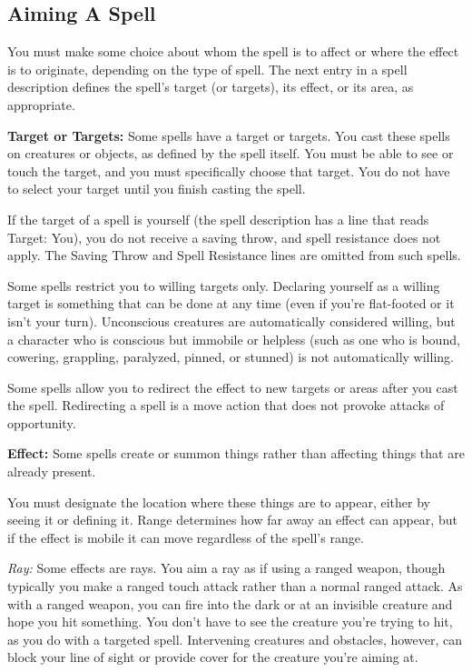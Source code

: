 \subsection{Aiming A Spell}
You must make some choice about whom the spell is to affect or where the effect is to originate, depending on the type of spell. The next entry in a spell description defines the spell's target (or targets), its effect, or its area, as appropriate.

\textbf{Target or Targets:} Some spells have a target or targets. You cast these spells on creatures or objects, as defined by the spell itself. You must be able to see or touch the target, and you must specifically choose that target. You do not have to select your target until you finish casting the spell.

If the target of a spell is yourself (the spell description has a line that reads Target: You), you do not receive a saving throw, and spell resistance does not apply. The Saving Throw and Spell Resistance lines are omitted from such spells.

Some spells restrict you to willing targets only. Declaring yourself as a willing target is something that can be done at any time (even if you're flat-footed or it isn't your turn). Unconscious creatures are automatically considered willing, but a character who is conscious but immobile or helpless (such as one who is bound, cowering, grappling, paralyzed, pinned, or stunned) is not automatically willing.

Some spells allow you to redirect the effect to new targets or areas after you cast the spell. Redirecting a spell is a move action that does not provoke attacks of opportunity.

\textbf{Effect:} Some spells create or summon things rather than affecting things that are already present.

You must designate the location where these things are to appear, either by seeing it or defining it. Range determines how far away an effect can appear, but if the effect is mobile it can move regardless of the spell's range.

\textit{Ray:} Some effects are rays. You aim a ray as if using a ranged weapon, though typically you make a ranged touch attack rather than a normal ranged attack. As with a ranged weapon, you can fire into the dark or at an invisible creature and hope you hit something. You don't have to see the creature you're trying to hit, as you do with a targeted spell. Intervening creatures and obstacles, however, can block your line of sight or provide cover for the creature you're aiming at.

